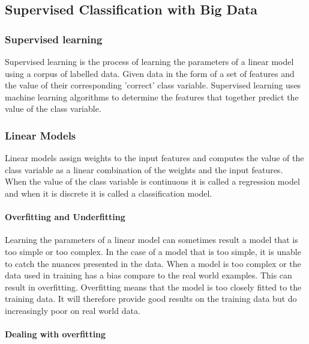 \subsection{Supervised Classification with Big Data}

\subsubsection{Supervised learning}
Supervised learning is the process of learning the parameters of a linear model using a corpus of labelled data.
Given data in the form of a set of features and the value of their corresponding 'correct' class variable.  
Supervised learning uses machine learning algorithms to determine the features that together predict the value of the class variable.  

\subsubsection{Linear Models}

Linear models assign weights to the input features and computes the value of the class variable as a linear combination of the weights and the input features.
When the value of the class variable is continuous it is called a regression model and when it is discrete it is called a classification model.


\paragraph{Overfitting and Underfitting}
Learning the parameters of a linear model can sometimes result a model that is too simple or too complex.
In the case of a model that is too simple, it is unable to catch the nuances presented in the data.
When a model is too complex or the data used in training has a bias compare to the real world examples.
This can result in overfitting.
Overfitting means that the model is too closely fitted to the training data.
It will therefore provide good results on the training data but do increasingly poor on real world data.

\paragraph{Dealing with overfitting}

